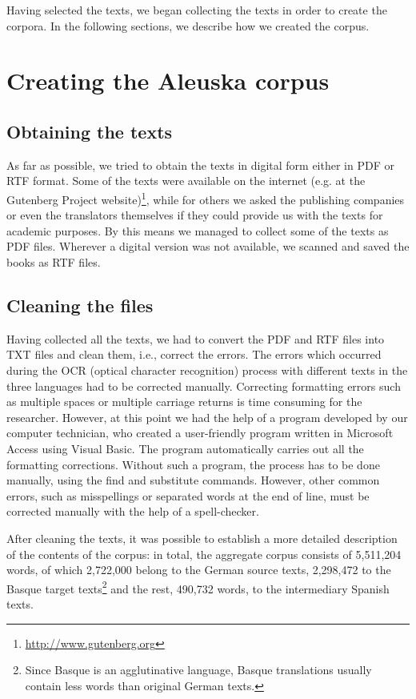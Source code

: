\documentclass[output=paper]{LSP/langsci}
\begin{document}
Having selected the texts, we began collecting the texts in order to create the corpora. In the following sections, we describe how we created the corpus.

\section{Creating the Aleuska corpus}
\subsection{Obtaining the texts}

As far as possible, we tried to obtain the texts in digital form either in PDF or RTF format. Some of the texts were available on the internet (e.g. at the Gutenberg Project website)\footnote{\url{http://www.gutenberg.org}}, while for others we asked the publishing companies or even the translators themselves if they could provide us with the texts for academic purposes. By this means we managed to collect some of the texts as PDF files. Wherever a digital version was not available, we scanned and saved the books as RTF files.

\subsection{Cleaning the files}

Having collected all the texts, we had to convert the PDF and RTF files into TXT files and clean them, i.e., correct the errors. The errors which occurred during the OCR (optical character recognition) process with different texts in the three languages had to be corrected manually. Correcting formatting errors such as multiple spaces or multiple carriage returns is time consuming for the researcher. However, at this point we had the help of a program developed by our computer technician, who created a user-friendly program written in Microsoft Access using Visual Basic. The program automatically carries out all the formatting corrections. Without such a program, the process has to be done manually, using the find and substitute commands. However, other common errors, such as misspellings or separated words at the end of line, must be corrected manually with the help of a spell-checker.

After cleaning the texts, it was possible to establish a more detailed description of the contents of the corpus: in total, the aggregate corpus consists of 5,511,204 words, of which 2,722,000 belong to the German source texts, 2,298,472 to the Basque target texts\footnote{Since Basque is an agglutinative language, Basque translations usually contain less words than original German texts.}  and the rest, 490,732 words, to the intermediary Spanish texts.
\end{document}
